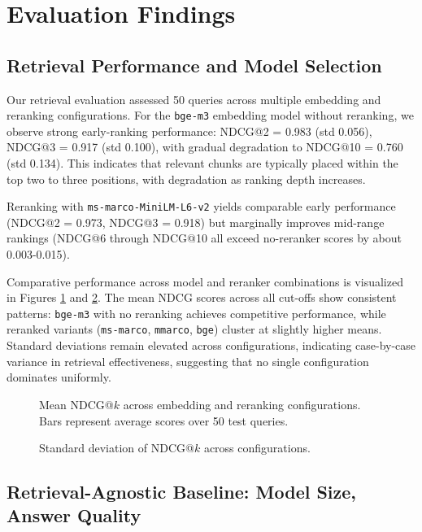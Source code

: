 \documentclass[conference]{IEEEtran}
\begin{document}
\section{Evaluation Findings}

\subsection{Retrieval Performance and Model Selection}
Our retrieval evaluation assessed 50 queries  across multiple embedding and reranking configurations. For the \texttt{bge-m3} embedding model without reranking, we observe strong early-ranking performance: NDCG@2 = 0.983 (std 0.056), NDCG@3 = 0.917 (std 0.100), with gradual degradation to NDCG@10 = 0.760 (std 0.134). This indicates that relevant chunks are typically placed within the top two to three positions, with degradation as ranking depth increases.

Reranking with \texttt{ms-marco-MiniLM-L6-v2} yields comparable early performance (NDCG@2 = 0.973, NDCG@3 = 0.918) but marginally improves mid-range rankings (NDCG@6 through NDCG@10 all exceed no-reranker scores by about 0.003-0.015).

Comparative performance across model and reranker combinations is visualized in Figures \ref{fig:ndcg_mean} and \ref{fig:ndcg_std}. The mean NDCG scores across all cut-offs show consistent patterns: \texttt{bge-m3} with no reranking achieves competitive performance, while reranked variants (\texttt{ms-marco}, \texttt{mmarco}, \texttt{bge}) cluster at slightly higher means. Standard deviations remain elevated across configurations, indicating case-by-case variance in retrieval effectiveness, suggesting that no single configuration dominates uniformly.

\begin{figure}[h]
\centering

\caption{Mean NDCG@$k$ across embedding and reranking configurations. Bars represent average scores over 50 test queries.}
\label{fig:ndcg_mean}
\end{figure}

\begin{figure}[h]
\centering

\caption{Standard deviation of NDCG@$k$ across configurations.}
\label{fig:ndcg_std}
\end{figure}



\subsection{Retrieval-Agnostic Baseline: Model Size, Answer Quality}
\end{document}
